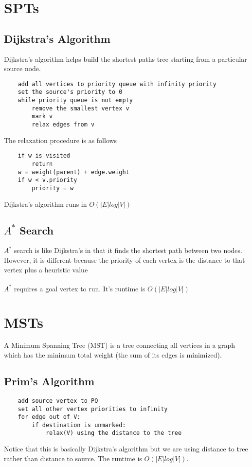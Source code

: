 \documentclass{article}
\begin{document}
\section{SPTs}
\subsection{Dijkstra's Algorithm}
Dijkstra's algorithm helps build the shortest paths tree starting from a particular source node.
\begin{lstlisting}
    add all vertices to priority queue with infinity priority
    set the source's priority to 0
    while priority queue is not empty
        remove the smallest vertex v
        mark v 
        relax edges from v
\end{lstlisting}
The relaxation procedure is as follows
\begin{lstlisting}
    if w is visited
        return
    w = weight(parent) + edge.weight
    if w < v.priority
        priority = w
\end{lstlisting}
Dijkstra's algorithm runs in $O(|E|log|V|)$
\subsection{$A^*$ Search}
$A^*$ search is like Dijkstra's in that it finds the shortest path between two nodes.
However, it is different because the priority of each vertex is the distance to that vertex plus a heuristic value
\\\\
$A^*$ requires a goal vertex to run. It's runtime is $O(|E|log|V|)$
\section{MSTs}
A Minimum Spanning Tree (MST) is a tree connecting all vertices in a graph which has the minimum total weight (the sum of its edges is minimized).
\subsection{Prim's Algorithm}
\begin{lstlisting}
    add source vertex to PQ
    set all other vertex priorities to infinity
    for edge out of V:
        if destination is unmarked:
            relax(V) using the distance to the tree
\end{lstlisting}
Notice that this is basically Dijkstra's algorithm but we are using distance to tree rather than distance to source.
The runtime is $O(|E|log|V|)$.
\end{document}
